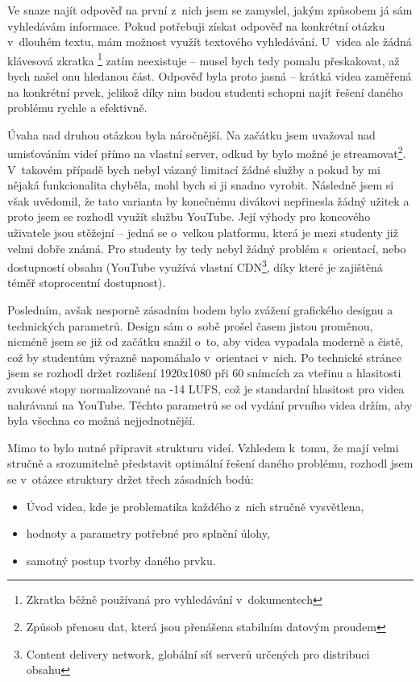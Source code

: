 Ve snaze najít odpověď na první z~nich jsem se zamyslel, jakým způsobem já sám vyhledávám informace.
Pokud potřebuji získat odpověď na konkrétní otázku v~dlouhém textu, mám možnost využít textového vyhledávání. 
U~videa ale žádná klávesová zkratka \footnote{Zkratka běžně používaná pro vyhledávání v~dokumentech} zatím neexistuje -- musel bych tedy pomalu přeskakovat, až bych našel onu hledanou část.
Odpověď byla proto jasná -- krátká videa zaměřená na konkrétní prvek, jelikož díky nim budou studenti schopni najít řešení daného problému rychle a efektivně.

Úvaha nad druhou otázkou byla náročnější.
Na začátku jsem uvažoval nad umisťováním videí přímo na vlastní server, odkud by bylo možné je streamovat\footnote{Způsob přenosu dat, která jsou přenášena stabilním datovým proudem}.
V~takovém případě bych nebyl vázaný limitací žádné služby a pokud by mi nějaká funkcionalita chyběla, mohl bych si ji snadno vyrobit.
Následně jsem si však uvědomil, že tato varianta by konečnému divákovi nepřinesla žádný užitek a proto jsem se rozhodl využít službu YouTube.
Její výhody pro koncového uživatele jsou stěžejní -- jedná se o~velkou platformu, která je mezi studenty již velmi dobře známá.
Pro studenty by tedy nebyl žádný problém s~orientací, nebo dostupností obsahu (YouTube využívá vlastní CDN\footnote{Content delivery network, globální síť serverů určených pro distribuci obsahu}, díky které je zajištěná téměř stoprocentní dostupnost).

Posledním, avšak nesporně zásadním bodem bylo zvážení grafického designu a technických parametrů.
Design sám o~sobě prošel časem jistou proměnou, nicméně jsem se již od začátku snažil o~to, aby videa vypadala moderně a čistě, což by studentům výrazně napomáhalo v~orientaci v~nich.
Po technické stránce jsem se rozhodl držet rozlišení 1920x1080 při 60 snímcích za vteřinu a hlasitosti zvukové stopy normalizované na -14 LUFS, což je standardní hlasitost pro videa nahrávaná na YouTube.
Těchto parametrů se od vydání prvního videa držím, aby byla všechna co možná nejjednotnější.

Mimo to bylo nutné připravit strukturu videí.
Vzhledem k~tomu, že mají velmi stručně a srozumitelně představit optimální řešení daného problému, rozhodl jsem se v~otázce struktury držet třech zásadních bodů:
\begin{itemize}[topsep=0pt]
    \setlength\itemsep{0em}
    \item Úvod videa, kde je problematika každého z~nich stručně vysvětlena,
    \item hodnoty a parametry potřebné pro splnění úlohy,
    \item samotný postup tvorby daného prvku.
\end{itemize}

